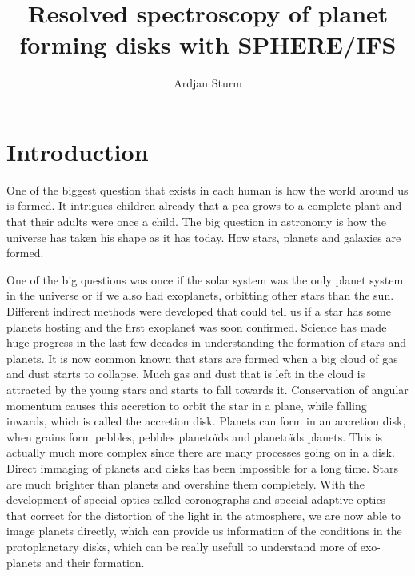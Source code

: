\documentclass[twoside,single]{lion-msc}
\title{Resolved spectroscopy of planet forming disks with SPHERE/IFS}
\author{Ardjan Sturm}
\begin{document}

\maketitle

\tableofcontents
\cleardoublepage



\chapter{Introduction}
One of the biggest question that exists in each human is how the world around us is formed. It intrigues children already that a pea grows to a complete plant and that their adults were once a child. The big question in astronomy is how the universe has taken his shape as it has today. How stars, planets and galaxies are formed.
\bigskip

One of the big questions was once if the solar system was the only planet system in the universe or if we also had exoplanets, orbitting other stars than the sun. Different indirect methods were developed that could tell us if a star has some planets hosting and the first exoplanet was soon confirmed. Science has made huge progress in the last few decades in understanding the formation of stars and planets. It is now common known that stars are formed when a big cloud of gas and dust starts to collapse. Much gas and dust that is left in the cloud is attracted by the young stars and starts to fall towards it. Conservation of angular momentum causes this accretion to orbit the star in a plane, while falling inwards, which is called the accretion disk. Planets can form in an accretion disk, when grains form pebbles, pebbles planeto\"ids and planeto\"ids planets. This is actually much more complex since there are many processes going on in a disk. Direct immaging of planets and disks has been impossible for a long time. Stars are much brighter than planets and overshine them completely. With the development of special optics called coronographs and special adaptive optics that correct for the distortion of the light in the atmosphere, we are now able to image planets directly, which can provide us information of the conditions in the protoplanetary disks, which can be really usefull to understand more of exo-planets and their formation.
\bigskip
\end{document}
